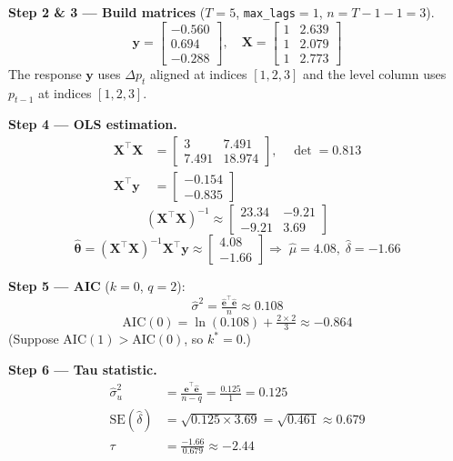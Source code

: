 \documentclass[10pt,a4paper,twocolumn]{article}
\begin{document}
\noindent\textbf{Step 2 \& 3 --- Build matrices} ($T=5$,
\texttt{max\_lags}$=1$, $n=T-1-1=3$).
\[
  \mathbf{y} = \begin{bmatrix}-0.560\\0.694\\-0.288\end{bmatrix},\quad
  \mathbf{X} = \begin{bmatrix}1 & 2.639\\1 & 2.079\\1 & 2.773\end{bmatrix}
\]
The response $\mathbf{y}$ uses $\Delta p_t$ aligned at indices $[1,2,3]$
and the level column uses $p_{t-1}$ at indices $[1,2,3]$.

\noindent\textbf{Step 4 --- OLS estimation.}
\begin{align*}
  \mathbf{X}^\top\mathbf{X} &=
    \begin{bmatrix}3 & 7.491\\7.491 & 18.974\end{bmatrix},
    \quad\det = 0.813\\
  \mathbf{X}^\top\mathbf{y} &=
    \begin{bmatrix}-0.154\\-0.835\end{bmatrix}
\end{align*}
\[
  (\mathbf{X}^\top\mathbf{X})^{-1} \approx
    \begin{bmatrix}23.34 & -9.21\\-9.21 & 3.69\end{bmatrix}
\]
\[
  \hat{\boldsymbol\theta} =
    (\mathbf{X}^\top\mathbf{X})^{-1}\mathbf{X}^\top\mathbf{y}
  \approx\begin{bmatrix}4.08\\-1.66\end{bmatrix}
  \Rightarrow\; \hat\mu=4.08,\;\hat\delta=-1.66
\]

\noindent\textbf{Step 5 --- AIC} ($k=0$, $q=2$):
\[
  \hat\sigma^2 = \tfrac{\hat{\mathbf{e}}^\top\hat{\mathbf{e}}}{n}
               \approx 0.108
\]
\[
  \mathrm{AIC}(0) = \ln(0.108)+\tfrac{2\times2}{3} \approx -0.864
\]
(Suppose AIC$(1)>$AIC$(0)$, so $k^*=0$.)

\noindent\textbf{Step 6 --- Tau statistic.}
\begin{align*}
  \hat\sigma^2_u &= \frac{\hat{\mathbf{e}}^\top\hat{\mathbf{e}}}{n-q}
  = \frac{0.125}{1} = 0.125\\
  \mathrm{SE}(\hat\delta) &=
    \sqrt{0.125\times 3.69} = \sqrt{0.461} \approx 0.679\\
  \tau &= \frac{-1.66}{0.679} \approx -2.44
\end{align*}
\end{document}
